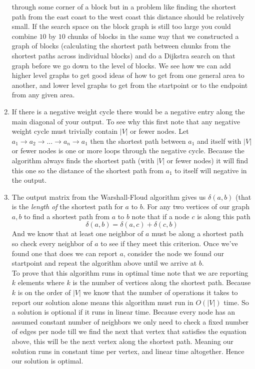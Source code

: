 \documentclass[11pt]{article}
\begin{document}
\begin{enumerate}
			through some corner of a block but in a problem like
			finding the shortest path from the east coast to the west
			coast this distance should be relatively small. If the
			search space on the block graph is still too large you
			could combine $10$ by $10$ chunks of blocks in the same
			way that we constructed a graph of blocks (calculating the
			shortest path between chunks from the shortest paths
			across individual blocks) and do a
			Dijkstra search on that graph before we go down to the
			level of blocks. We see how we can add higher level
			graphs to get good ideas of how to get from one general
			area to another, and lower level graphs to get from the
			startpoint or to the endpoint from any given area.
			\item 
			If there is a negative weight cycle there would be a
			negative entry along the main diagonal of your output.
			To see why this first note that any negative weight
			cycle must trivially contain $|V|$ or fewer nodes.
			Let $a_1 \rightarrow a_2 \rightarrow ... \rightarrow a_n
			\rightarrow a_1$
			then the shortest path between $a_1$ and itself 
			with $|V|$ or fewer nodes is one or more loops through the 
			negative cycle. Because the algorithm always 
			finds the shortest path (with $|V|$ or fewer nodes) it
			will find this one so the distance of the shortest path from $a_1$ to
			itself will negative in the output.
		\item The output matrix from the Warshall-Floud algorithm gives us
			$\delta(a,b)$ (that is the \textit{length of} the
			shortest path for $a$ to $b$. For any two vertices of our graph $a,b$ to
			find a shortest path from $a$ to $b$ note that if a node
			$c$ is along this path
			$$\delta(a,b) = \delta(a,c) + \delta(c,b)$$
			And we know that at least one neighbor of $a$ must be
			along a shortest path so check every neighbor of $a$ to see if
			they meet this criterion. Once we've found one that does
			we can report $a$, consider the node we found our
			startpoint and repeat the algorithm above until we
			arrive at
			$b$.\\
			To prove that this algorithm runs in optimal time note
			that we are reporting $k$ elements where $k$ is the
			number of vertices along the shortest path. Because $k$ is
			on the order of $|V|$ we know that the number of
			operations it takes to
			report our solution alone means this algorithm must run
			in $O(|V|)$ time. So a solution is optional if it
			runs in linear time.
			Because every node has an assumed constant number of
			neighbors we only need to check a fixed number of edges
			per node till we find the next that vertex that
			satisfies the
			equation above, this will be the next vertex along the shortest
			path. Meaning our solution runs in constant time per
			vertex, and linear time altogether. Hence our
			solution is optimal.
\end{enumerate}
\end{document}
